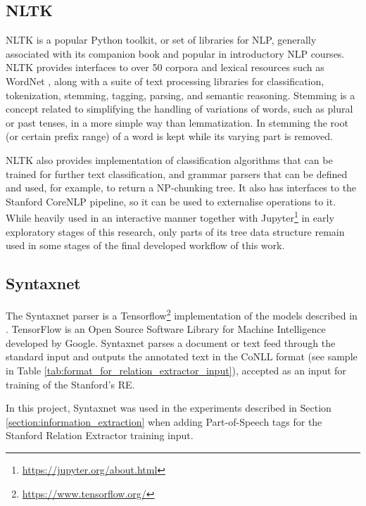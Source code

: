 \documentclass[11pt,a4paper,openright]{memoir}
\begin{document}
\subsection{NLTK}

NLTK \cite{BirdKleinLoper09} is a popular Python toolkit, or set of libraries for NLP, generally associated with its companion book and popular in introductory NLP courses. NLTK provides interfaces to over 50 corpora and lexical resources such as WordNet \cite{Miller:1995:WLD:219717.219748}, along with a suite of text processing libraries for classification, tokenization, stemming, tagging, parsing, and semantic reasoning. Stemming is a concept related to simplifying the handling of variations of words, such as plural or past tenses, in a more simple way than lemmatization. In stemming the root (or certain prefix range) of a word is kept while its varying part is removed.

NLTK also provides implementation of classification algorithms that can be trained for further text classification, and grammar parsers that can be defined and used, for example, to return a NP-chunking tree. It also has interfaces to the Stanford CoreNLP pipeline, so it can be used to externalise operations to it. While heavily used in an interactive manner together with Jupyter\footnote{\url{https://jupyter.org/about.html}} in early exploratory stages of this research, only parts of its tree data structure remain used in some stages of the final developed workflow of this work.

\subsection{Syntaxnet}

The Syntaxnet parser \cite{google-syntaxnet} is a Tensorflow\footnote{\url{https://www.tensorflow.org/}} implementation of the models described in \cite{DBLP:journals/corr/AndorAWSPGPC16}. TensorFlow is an Open Source Software Library for Machine Intelligence developed by Google. Syntaxnet parses a document or text feed through the standard input and outputs the annotated text in the CoNLL format (see sample in Table \ref{tab:format_for_relation_extractor_input}), accepted as an input for training of the Stanford's RE.

In this project, Syntaxnet was used in the experiments described in Section \ref{section:information_extraction} when adding Part-of-Speech tags for the Stanford Relation Extractor training input.
\end{document}
